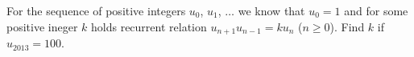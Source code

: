 \problem{}
For the sequence of positive integers $u_0$, $u_1$, $\ldots$ we know that
$u_0 = 1$ and for some positive ineger $k$ holds recurrent relation $u_{n+1} u_{n-1} = k u_n$ ($n \geq 0$).
Find $k$ if $u_{2013} = 100$.

\solution

\endproblem
